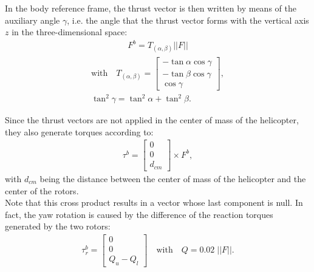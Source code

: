 \noindent In the body reference frame, the thrust vector is then written by means of the auxiliary angle $\gamma$, i.e. the angle that the thrust vector forms with the vertical axis $z$ in the three-dimensional space:
\begin{align}
    F^b = T_{(\alpha, \beta)}||F|| \label{eq:force}
\end{align}
\vspace*{-0.6cm}
\begin{align*}\text{with} \quad T_{(\alpha, \beta)} = \begin{bmatrix}
        -\tan{\alpha} \cos{\gamma} \\
        -\tan{\beta} \cos{\gamma} \\
        \cos{\gamma}
    \end{bmatrix}, \\
    \tan^2{\gamma} = \tan^2{\alpha} + \tan^2{\beta}. 
\end{align*}

Since the thrust vectors are not applied in the center of mass of the helicopter, they also generate torques according to:
\begin{align} 
    \tau^b = \begin{bmatrix}
        0 \\ 0 \\ d_{cm}
    \end{bmatrix} \times F^b, \label{eq:torque_due_force}
\end{align}
with $d_{cm}$ being the distance between the center of mass of the helicopter and the center of the rotors.\\
Note that this cross product results in a vector whose last component is null. In fact, the yaw rotation is caused by the difference of the reaction torques generated by the two rotors:
\begin{align} 
    \tau^b_r = \begin{bmatrix}
        0 \\ 0 \\ Q_u - Q_l
    \end{bmatrix} \quad \text{with} \quad Q = 0.02 \; ||F||. \label{eq:reaction_torque}
\end{align}

